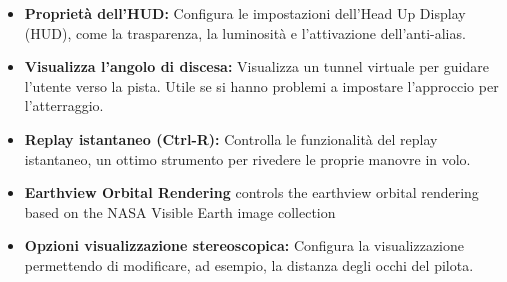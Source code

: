 \begin{itemize}
{\begin{itemize}
  \item \textbf{Propriet\`{a} dell'HUD:} Configura le impostazioni dell'Head Up Display (HUD), come la trasparenza, la luminosit\`{a} e l'attivazione dell'anti-alias.
  \item \textbf{Visualizza l'angolo di discesa:} Visualizza un tunnel virtuale per guidare l'utente verso la pista. Utile se si hanno problemi a impostare l'approccio per l'atterraggio.
  \item \textbf{Replay istantaneo (Ctrl-R):} Controlla le funzionalit\`{a} del replay istantaneo, un ottimo strumento per rivedere le proprie manovre in volo.
  \item \textbf{Earthview Orbital Rendering} controls the earthview orbital rendering based on the NASA Visible Earth image collection
  \item \textbf{Opzioni visualizzazione stereoscopica:} Configura la visualizzazione permettendo di modificare, ad esempio, la distanza degli occhi del pilota.
 \end{itemize}
}{}


\end{itemize}
